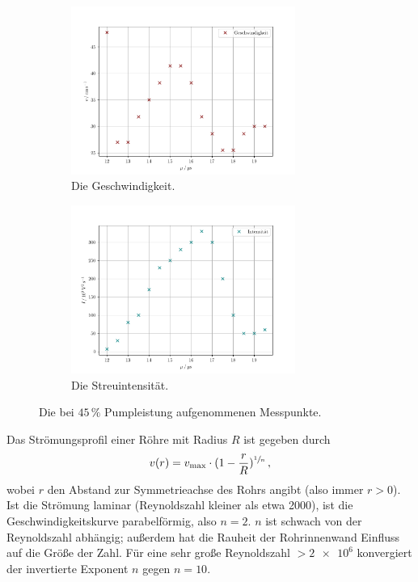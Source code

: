 \begin{figure}
    \centering
    \begin{subfigure}{0.48\textwidth}
        \centering
        \includegraphics[height=5.5cm]{plots/45velocity.pdf}
        \caption{Die Geschwindigkeit.}
        \label{fig:45velo}
    \end{subfigure}
    \begin{subfigure}{0.48\textwidth}
        \centering
        \includegraphics[height=5.5cm]{plots/45intensity.pdf}
        \caption{Die Streuintensität.}
        \label{fig:45inten}
    \end{subfigure}
    \caption{Die bei $45\,\%$ Pumpleistung aufgenommenen Messpunkte.}
    \label{fig:45vi}
\end{figure}

Das Strömungsprofil einer Röhre mit Radius $R$ ist gegeben durch 
\begin{equation}
    v(r)=v_\text{max}\cdot (1-\frac{r}{R})^{\sfrac{1}{n}}\,,
    \label{eqn:Geschwindigkeit}
\end{equation}
wobei $r$ den Abstand zur Symmetrieachse des Rohrs angibt (also immer $r>0$).
Ist die Strömung laminar (Reynoldszahl kleiner als etwa 2000), ist die Geschwindigkeitskurve parabelförmig, also $n=2$.
$n$ ist schwach von der Reynoldszahl abhängig; außerdem hat die Rauheit der Rohrinnenwand Einfluss auf die Größe der Zahl. 
Für eine sehr große Reynoldszahl $>\num{2e6}$ konvergiert der invertierte Exponent $n$ gegen $n=10$. 

